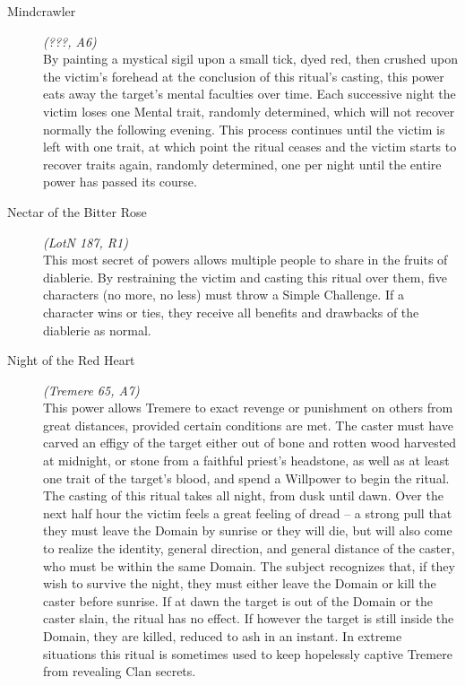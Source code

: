 \begin{description}
	\item[Mindcrawler] \emph{(???, A6)} \hfill \\
	By painting a mystical sigil upon a small tick, dyed red, then crushed upon the victim's forehead at the conclusion of this 
	ritual's casting, this power eats away the target's mental faculties over time.  Each successive night the victim loses 
	one Mental trait, randomly determined, which will not recover normally the following evening.  This process continues until 
	the victim is left with one trait, at which point the ritual ceases and the victim starts to recover traits again, randomly 
	determined, one per night until the entire power has passed its course. \\

	\item[Nectar of the Bitter Rose] \emph{(LotN 187, R1)} \hfill \\
	This most secret of powers allows multiple people to share in the fruits of diablerie.  By restraining the victim and casting 
	this ritual over them, five characters (no more, no less) must throw a Simple Challenge.  If a character wins or ties, they 
	receive all benefits and drawbacks of the diablerie as normal. \\

	\item[Night of the Red Heart] \emph{(Tremere 65, A7)} \hfill \\
	This power allows Tremere to exact revenge or punishment on others from great distances, provided certain conditions are met.  
	The caster must have carved an effigy of the target either out of bone and rotten wood harvested at midnight, or stone from 
	a faithful priest's headstone, as well as at least one trait of the target's blood, and spend a Willpower to begin the ritual.  
	The casting of this ritual takes all night, from dusk until dawn.  Over the next half hour the victim feels a great feeling of 
	dread -- a strong pull that they must leave the Domain by sunrise or they will die, but will also come to realize the identity, 
	general direction, and general distance of the caster, who must be within the same Domain.  The subject recognizes that, if 
	they wish to survive the night, they must either leave the Domain or kill the caster before sunrise.  If at dawn the target 
	is out of the Domain or the caster slain, the ritual has no effect.  If however the target is still inside the Domain, they 
	are killed, reduced to ash in an instant.  In extreme situations this ritual is sometimes used to keep hopelessly captive 
	Tremere from revealing Clan secrets. \\


\end{description}
